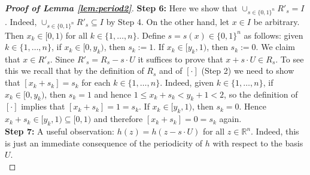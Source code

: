 \documentclass[12 pt]{amsart}
\theoremstyle{definition}
\newcommand{\R}{\mathbb{R}}
\newcommand{\bref}[1]{\textbf{\ref{#1}}} %
\begin{document}
\begin{proof}[{\bf Proof of Lemma \bref{lem:period2}}]
{\noindent \bf Step 6:} Here we show that $\cup_{s\in\{0,1\}^n}R'_s=I$. Indeed,  $\cup_{s\in\{0,1\}^n}R'_s\subseteq I$ by Step 4. On the other hand, let $x\in I$ be arbitrary. Then $x_k\in [0,1)$ for all $k\in \{1,\ldots,n\}$. Define $s=s(x)\in \{0,1\}^n$ as follows: given $k\in\{1,\ldots,n\}$, if $x_k\in [0,y_k)$, then  $s_k:=1$. If $x_k\in [y_k,1)$, then $s_k:=0$. We claim that $x\in R'_s$. Since $R'_s=R_s-s\cdot U$ it suffices to prove that $x+s\cdot U\in R_s$. To see this we recall that by the definition of $R_s$ and of $[\cdot]$ (Step 2) we need to show that $[x_k+s_k]=s_k$ for each $k\in\{1,\ldots,n\}$. Indeed, given $k\in\{1,\ldots,n\}$, if $x_k\in [0,y_k)$, then $s_k=1$ and hence $1\leq x_k+s_k<y_k+1<2$, so the definition of $[\cdot]$ implies that $[x_k+s_k]=1=s_k$. If $x_k\in [y_k,1)$, then $s_k=0$. Hence $x_k+s_k\in [y_k,1)\subseteq [0,1)$ and therefore $[x_k+s_k]=0=s_k$ again.\\

{\noindent \bf Step 7:} A useful observation: $h(z)=h(z-s\cdot U)$ for all $z\in \R^n$. Indeed, this is just an immediate consequence of the periodicity of $h$ with respect to the basis $U$.\\


\end{proof}
\end{document}
